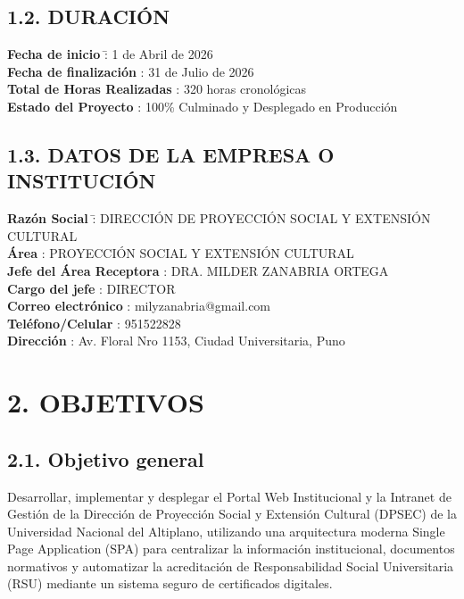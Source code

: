 \documentclass[11pt,a4paper]{article}
\begin{document}
\subsection*{1.2. DURACIÓN}
\begin{tabbing}
\textbf{Fecha de inicio} \hspace{3.5cm} \=: 1 de Abril de 2026 \\
\textbf{Fecha de finalización} \>: 31 de Julio de 2026 \\
\textbf{Total de Horas Realizadas} \>: 320 horas cronológicas \\
\textbf{Estado del Proyecto} \>: 100\% Culminado y Desplegado en Producción
\end{tabbing}

\subsection*{1.3. DATOS DE LA EMPRESA O INSTITUCIÓN}
\begin{tabbing}
\textbf{Razón Social} \hspace{3.5cm} \=: DIRECCIÓN DE PROYECCIÓN SOCIAL Y EXTENSIÓN CULTURAL \\
\textbf{Área} \>: PROYECCIÓN SOCIAL Y EXTENSIÓN CULTURAL \\
\textbf{Jefe del Área Receptora} \>: DRA. MILDER ZANABRIA ORTEGA \\
\textbf{Cargo del jefe} \>: DIRECTOR \\
\textbf{Correo electrónico} \>: milyzanabria@gmail.com \\
\textbf{Teléfono/Celular} \>: 951522828 \\
\textbf{Dirección} \>: Av. Floral Nro 1153, Ciudad Universitaria, Puno
\end{tabbing}

\newpage

\section*{2. OBJETIVOS}
\subsection*{2.1. Objetivo general}
Desarrollar, implementar y desplegar el Portal Web Institucional y la Intranet de Gestión de la Dirección de Proyección Social y Extensión Cultural (DPSEC) de la Universidad Nacional del Altiplano, utilizando una arquitectura moderna Single Page Application (SPA) para centralizar la información institucional, documentos normativos y automatizar la acreditación de Responsabilidad Social Universitaria (RSU) mediante un sistema seguro de certificados digitales.
\end{document}
